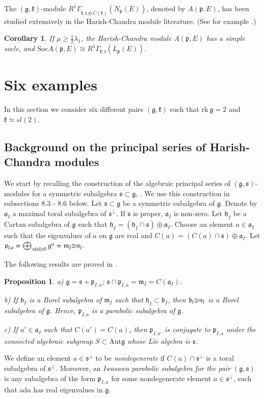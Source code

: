 \documentclass[11pt]{amsart}
\newcounter{theorem}
\newtheorem{corollary}[theo]{Corollary}
\newtheorem{prop}[theo]{Proposition}
\renewcommand{\ss}{\mathfrak{s}}
\renewcommand{\tt}{\mathfrak{t}}
\newcommand{\kk}{\mathfrak{k}}
\newcommand{\nn}{\mathfrak{n}}
\newcommand{\mm}{\mathfrak{m}}
\renewcommand{\aa}{\mathfrak{a}}
\newcommand{\hh}{\mathfrak{h}}
\newcommand{\pp}{\mathfrak{p}}
\renewcommand{\gg}{\mathfrak{g}}
\newcommand{\bb}{\mathfrak{b}}
\newcommand{\Soc}{\mathrm{Soc}}
\newcommand{\rk}{\mathrm{rk~}}
\def\crplus{\hbox{$\supset${\raise1.05pt\hbox{\kern -0.55em ${\scriptscriptstyle +}$}}\ }}
\begin{document}
The $(\gg,\kk)$-module $R^1\Gamma_{\tilde{\kk},\tt\oplus C(\kk)}(N_\pp(E))$, denoted by $A(\pp,E)$, has been studied extensively in the Harish-Chandra module literature. (See for example \cite{KV}.)
\begin{corollary}
If $\mu\geq\frac{1}{2}\lambda_1$, the Harish-Chandra module $A(\pp,E)$ has a simple socle, and $\Soc A(\pp,E)\cong R^1 \Gamma_{\kk,\tt}(L_\pp(E))$.
\end{corollary}

\section{Six examples}
In this section we consider six different pairs $(\gg,\kk)$ such that $\rk\gg=2$ and $\kk\simeq sl(2)$.

\subsection{Background on the principal series of Harish-Chandra modules} %

We start by recalling the construction of the algebraic principal series of $(\gg,\ss)$-modules for a symmetric subalgebra $\ss\subset\gg$, \cite{D}. We use this construction in subsections 8.3 - 8.6 below. Let $\ss\subset\gg$ be a symmetric subalgebra of $\gg$. Denote by $\aa_I$ a maximal toral subalgebra of $\ss^\perp$. If $\ss$ is proper, $\aa_I$ is non-zero. Let $\hh_I$ be a Cartan subalgebra of $\gg$ such that $\hh_I=(\hh_I\cap\ss)\oplus\aa_I$. Choose an element $a\in\aa_I$ such that the eigenvalues of $a$ on $\gg$ are real and $C(a)=(C(a)\cap\ss)\oplus\aa_I$. Let $\pp_{I,a}=\bigoplus_{\alpha(a)\geq 0} \gg^\alpha=\mm_I\crplus\nn_I$. 

The following results are proved in \cite{D}.
\begin{prop}
a) $\gg=\ss+\pp_{I,a}$; $\ss\cap\pp_{I,a}=\mm_I=C(\aa_I)$.

b) If $\bb_I$ is a Borel subalgebra of $\mm_I$ such that $\hh_I\subset\bb_I$, then $\bb_I\crplus\nn_I$ is a Borel subalgebra of $\gg$. Hence, $\pp_{I,a}$ is a parabolic subalgebra of $\gg$.

c) If $a'\in\aa_I$ such that $C(a')=C(a)$, then $\pp_{I,a'}$ is conjugate to $\pp_{I,a}$ under the connected algebraic subgroup $S\subset\mathrm{Aut}\gg$ whose Lie algebra is $\ss$.
\end{prop}
We define an element $a\in\ss^\perp$ to be \textit{nondegenerate} if $C(a)\cap\ss^\perp$ is a toral subalgebra of $\ss^\perp$. Moreover, an \textit{Iwasawa parabolic subalgebra for the pair} $(\gg,\ss)$ is any subalgebra of the form $\pp_{I,a}$ for some nondegenerate element $a\in\ss^\perp$, such that ad$a$ has real eigenvalues in $\gg$.
\end{document}
